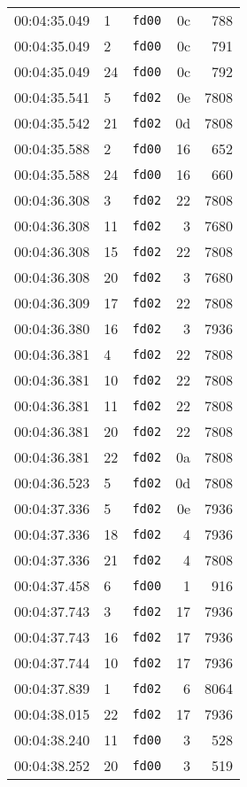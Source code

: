 \documentclass{article}
\begin{document}
\begin{longtable}{lllrr}
00:04:35.049 & 1 & \texttt{fd00} & 0c & 788 \\
00:04:35.049 & 2 & \texttt{fd00} & 0c & 791 \\
00:04:35.049 & 24 & \texttt{fd00} & 0c & 792 \\
00:04:35.541 & 5 & \texttt{fd02} & 0e & 7808 \\
00:04:35.542 & 21 & \texttt{fd02} & 0d & 7808 \\
00:04:35.588 & 2 & \texttt{fd00} & 16 & 652 \\
00:04:35.588 & 24 & \texttt{fd00} & 16 & 660 \\
00:04:36.308 & 3 & \texttt{fd02} & 22 & 7808 \\
00:04:36.308 & 11 & \texttt{fd02} & 3 & 7680 \\
00:04:36.308 & 15 & \texttt{fd02} & 22 & 7808 \\
00:04:36.308 & 20 & \texttt{fd02} & 3 & 7680 \\
00:04:36.309 & 17 & \texttt{fd02} & 22 & 7808 \\
00:04:36.380 & 16 & \texttt{fd02} & 3 & 7936 \\
00:04:36.381 & 4 & \texttt{fd02} & 22 & 7808 \\
00:04:36.381 & 10 & \texttt{fd02} & 22 & 7808 \\
00:04:36.381 & 11 & \texttt{fd02} & 22 & 7808 \\
00:04:36.381 & 20 & \texttt{fd02} & 22 & 7808 \\
00:04:36.381 & 22 & \texttt{fd02} & 0a & 7808 \\
00:04:36.523 & 5 & \texttt{fd02} & 0d & 7808 \\
00:04:37.336 & 5 & \texttt{fd02} & 0e & 7936 \\
00:04:37.336 & 18 & \texttt{fd02} & 4 & 7936 \\
00:04:37.336 & 21 & \texttt{fd02} & 4 & 7808 \\
00:04:37.458 & 6 & \texttt{fd00} & 1 & 916 \\
00:04:37.743 & 3 & \texttt{fd02} & 17 & 7936 \\
00:04:37.743 & 16 & \texttt{fd02} & 17 & 7936 \\
00:04:37.744 & 10 & \texttt{fd02} & 17 & 7936 \\
00:04:37.839 & 1 & \texttt{fd02} & 6 & 8064 \\
00:04:38.015 & 22 & \texttt{fd02} & 17 & 7936 \\
00:04:38.240 & 11 & \texttt{fd00} & 3 & 528 \\
00:04:38.252 & 20 & \texttt{fd00} & 3 & 519 \\

\end{longtable}
\end{document}
